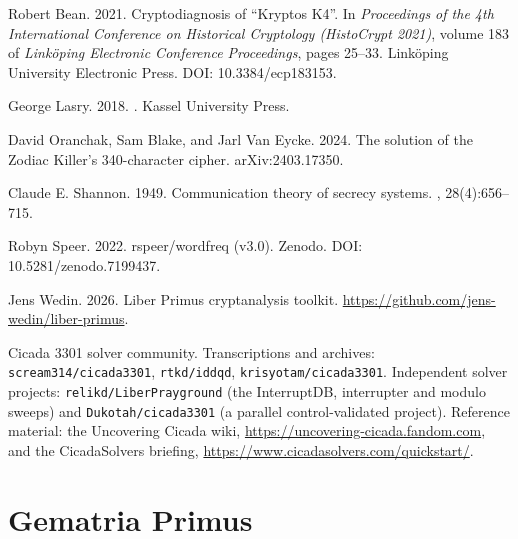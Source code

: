 \documentclass[11pt]{article}
\begin{document}
\begin{thebibliography}{}

Robert Bean. 2021.
\newblock Cryptodiagnosis of ``Kryptos K4''.
\newblock In {\em Proceedings of the 4th International Conference on Historical Cryptology (HistoCrypt 2021)}, volume 183 of {\em Link\"oping Electronic Conference Proceedings}, pages 25--33. Link\"oping University Electronic Press. DOI: 10.3384/ecp183153.

George Lasry. 2018.
.
\newblock Kassel University Press.

David Oranchak, Sam Blake, and Jarl Van Eycke. 2024.
\newblock The solution of the Zodiac Killer's 340-character cipher.
\newblock arXiv:2403.17350.

Claude E. Shannon. 1949.
\newblock Communication theory of secrecy systems.
, 28(4):656--715.

Robyn Speer. 2022.
\newblock rspeer/wordfreq (v3.0).
\newblock Zenodo. DOI: 10.5281/zenodo.7199437.

Jens Wedin. 2026.
\newblock Liber Primus cryptanalysis toolkit.
\newblock \url{https://github.com/jens-wedin/liber-primus}.

Cicada 3301 solver community.
\newblock Transcriptions and archives: {\tt scream314/cicada3301}, {\tt rtkd/iddqd}, {\tt krisyotam/cicada3301}. Independent solver projects: {\tt relikd/LiberPrayground} (the InterruptDB, interrupter and modulo sweeps) and {\tt Dukotah/cicada3301} (a parallel control-validated project). Reference material: the Uncovering Cicada wiki, \url{https://uncovering-cicada.fandom.com}, and the CicadaSolvers briefing, \url{https://www.cicadasolvers.com/quickstart/}.

\end{thebibliography}

\appendix

\section{Gematria Primus}
\end{document}
